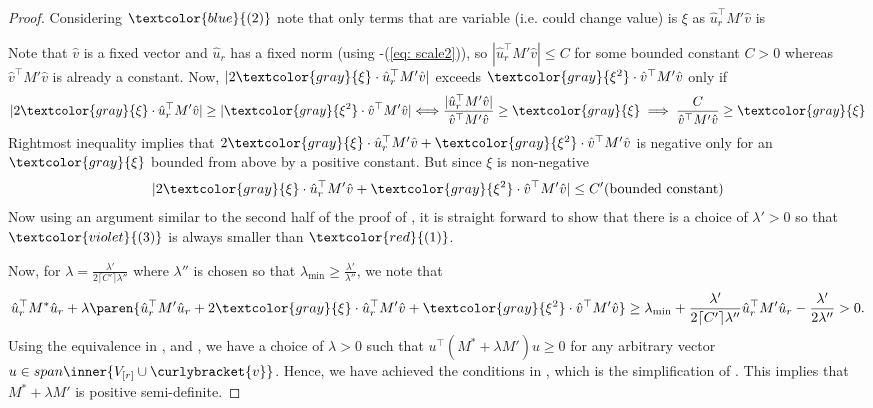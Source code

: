 \begin{proof}
    Considering $\textcolor{blue}{(2)}$ note that only terms that are variable (i.e. could change value) is $\xi$ as $\hat{u}_r^{\top} M' \hat{v}$ is 

    Note that $\hat{v}$ is a fixed vector and $\hat{u}_r$ has a fixed norm (using -(\ref{eq: scale2})), so $|\hat{u}_r^{\top} M' \hat{v}| \le C$ for some bounded constant $C > 0$ whereas $\hat{v}^{\top}M'\hat{v}$ is already a constant. Now, $|2 \textcolor{gray}{\xi}\cdot \hat{u}_r^{\top} M' \hat{v}|$ exceeds $\textcolor{gray}{\xi^2}\cdot \hat{v}^{\top}M'\hat{v}$ only if
    \begin{align*}
        |2 \textcolor{gray}{\xi}\cdot \hat{u}_r^{\top} M' \hat{v}| \ge |\textcolor{gray}{\xi^2}\cdot \hat{v}^{\top}M'\hat{v}| %
        \Longleftrightarrow \frac{|\hat{u}_r^{\top} M' \hat{v}|}{\hat{v}^{\top}M'\hat{v}} \ge \textcolor{gray}{\xi} \implies \frac{C}{\hat{v}^{\top}M'\hat{v}} \ge \textcolor{gray}{\xi}
    \end{align*}
    Rightmost inequality implies that $2 \textcolor{gray}{\xi}\cdot \hat{u}_r^{\top} M' \hat{v} + \textcolor{gray}{\xi^2}\cdot \hat{v}^{\top}M'\hat{v}$ is negative only for an $\textcolor{gray}{\xi}$ bounded from above by a positive constant. But since $\xi$ is non-negative 
    \begin{align*}
        |2 \textcolor{gray}{\xi}\cdot \hat{u}_r^{\top} M' \hat{v} + \textcolor{gray}{\xi^2}\cdot \hat{v}^{\top}M'\hat{v}| \le C' (\textnormal{bounded constant})
    \end{align*}
    Now using an argument similar to the second half of the proof of , it is straight forward to show that there is a choice of $\lambda' > 0$ so that $\textcolor{violet}{(3)}$ is always smaller than $\textcolor{red}{(1)}$.

    Now, for $\lambda = \frac{\lambda'}{2\lceil C' \rceil \lambda''}$ where $\lambda''$ is chosen so that $\lambda_{\min} \ge \frac{\lambda'}{\lambda''}$, we note that
    \begin{align*}
        \hat{u}_r^{\top}M^*\hat{u}_r + \lambda\paren{ \hat{u}_r^{\top}M'\hat{u}_r + 2 \textcolor{gray}{\xi}\cdot \hat{u}_r^{\top} M' \hat{v} + \textcolor{gray}{\xi^2}\cdot \hat{v}^{\top}M'\hat{v} } \ge \lambda_{\min} + \frac{\lambda'}{2\lceil C' \rceil \lambda''} \hat{u}_r^{\top}M'\hat{u}_r -\frac{\lambda'}{2\lambda''} >  0.
    \end{align*}
    Using the equivalence in ,  and , we have a choice of $\lambda > 0$ such that $u^{\top}(M^* + \lambda M')u \ge 0$ for any arbitrary vector $u \in span\inner{V_{[r]} \cup \curlybracket{v}}$. Hence, we have achieved the conditions in , which is the simplification of . This implies that $M^* + \lambda M'$ is positive semi-definite. 
    

\end{proof}
